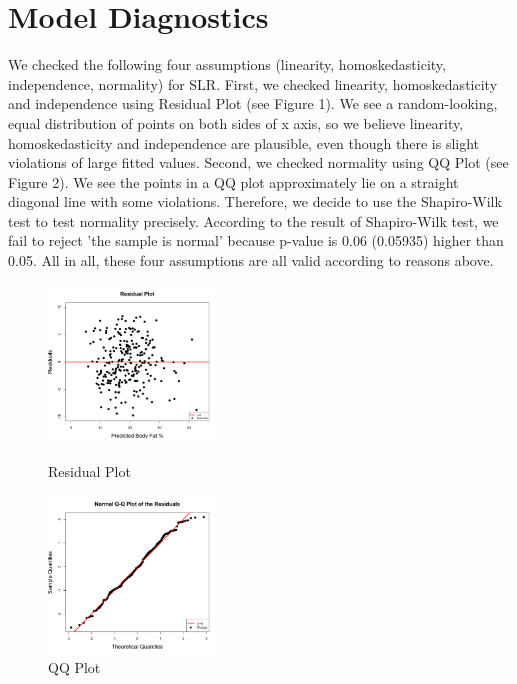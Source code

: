 \documentclass[12pt]{article}
\begin{document}
\section{\vspace{-0.3cm}Model Diagnostics}

We checked the following four assumptions (linearity, homoskedasticity, independence, normality) for SLR. First, we checked linearity, homoskedasticity and independence using Residual Plot (see Figure 1). We see a random-looking, equal distribution of points on both sides of x axis, so we believe linearity, homoskedasticity and independence are plausible, even though there is slight violations of large fitted values. 
Second, we checked normality using QQ Plot (see Figure 2). We see the points in a QQ plot approximately lie on a straight diagonal line with some violations. Therefore, we decide to use the Shapiro-Wilk test to test normality precisely. According to the result of Shapiro-Wilk test, we fail to reject 'the sample is normal' because p-value is 0.06 (0.05935) higher than 0.05. All in all, these four assumptions are all valid according to reasons above.

\begin{figure}[H]
\centering
\begin{minipage}[t]{0.4\textwidth}
\centering
\includegraphics[width=4.5cm]{../image/residual_plot.png}
\caption{Residual Plot}
\end{minipage}
\begin{minipage}[t]{0.4\textwidth}
\centering
\includegraphics[width=4.5cm]{../image/QQ_plot.png}
\caption{QQ Plot}
\end{minipage}
\end{figure}
\end{document}
